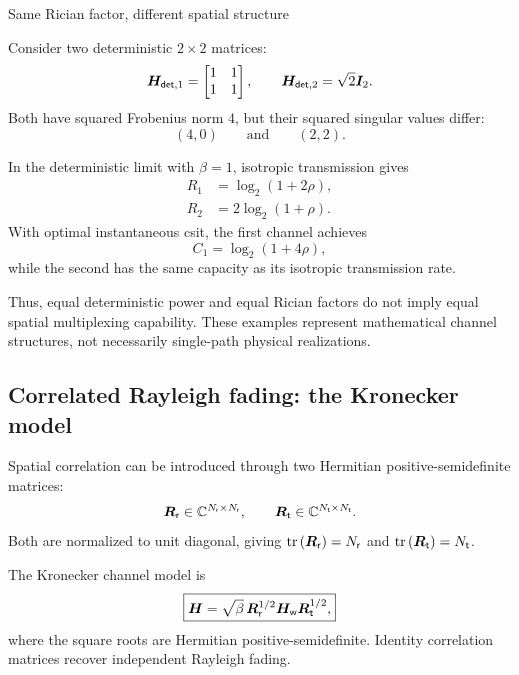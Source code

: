 \begin{example}{Same Rician factor, different spatial structure}
	\label{ex:rician}
	
	Consider two deterministic $2\times2$ matrices:
	\begin{equation*}
		\bm{H}_{\mathsf{det},1}
		=
		\begin{bmatrix}
			1&1\\1&1
		\end{bmatrix},
		\qquad
		\bm{H}_{\mathsf{det},2}
		=\sqrt{2}\bm{I}_2.
	\end{equation*}
	Both have squared Frobenius norm $4$, but their
	squared singular values differ:
	\begin{equation*}
		(4,0)
		\qquad\text{and}\qquad
		(2,2).
	\end{equation*}
	
	In the deterministic limit with $\beta=1$,
	isotropic transmission gives
	\begin{align*}
		R_1&=\log_2(1+2\rho),\\
		R_2&=2\log_2(1+\rho).
	\end{align*}
	With optimal instantaneous \ac{csit},
	the first channel achieves
	\begin{equation*}
		C_1=\log_2(1+4\rho),
	\end{equation*}
	while the second has the same capacity as its
	isotropic transmission rate.
	
	Thus, equal deterministic power and equal Rician
	factors do not imply equal spatial multiplexing
	capability. These examples represent mathematical
	channel structures, not necessarily single-path
	physical realizations.
\end{example}


\subsection{Correlated Rayleigh fading: the Kronecker model}

Spatial correlation can be introduced through
two Hermitian positive-semidefinite matrices:
\begin{equation*}
	\bm{R}_{\mathsf r}\in
	\mathbb{C}^{N_{\mathsf{r}}\times N_{\mathsf{r}}},
	\qquad
	\bm{R}_{\mathsf t}\in
	\mathbb{C}^{N_{\mathsf{t}}\times N_{\mathsf{t}}}.
\end{equation*}
Both are normalized to unit diagonal, giving
$\operatorname{tr}\left(\bm{R}_{\mathsf r}\right)=N_{\mathsf{r}}$ and
$\operatorname{tr}\left(\bm{R}_{\mathsf t}\right)=N_{\mathsf{t}}$.

The Kronecker channel model is
\begin{equation}\label{eq:kronecker}
	\boxed{
		\bm{H}=\sqrt{\beta}\,
		\bm{R}_{\mathsf r}^{1/2}
		\bm{H}_{\mathsf w}
		\bm{R}_{\mathsf t}^{1/2},
	}
\end{equation}
where the square roots are Hermitian
positive-semidefinite.
Identity correlation matrices recover independent
Rayleigh fading.

